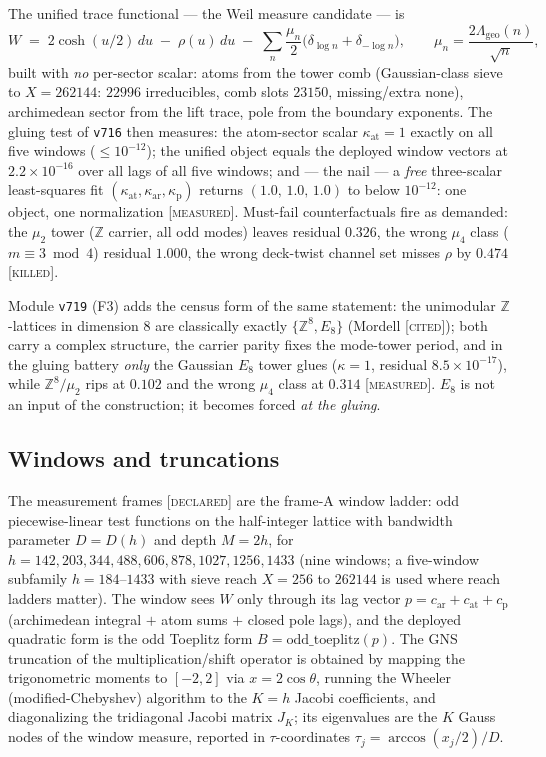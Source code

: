 \documentclass[11pt,a4paper]{article}
\theoremstyle{remark}
\newcommand{\Z}{\mathbb Z}
\newcommand{\MEASURED}{\textnormal{[\textsc{measured}]}}
\newcommand{\KILLED}{\textnormal{[\textsc{killed}]}}
\newcommand{\DECLARED}{\textnormal{[\textsc{declared}]}}
\newcommand{\CITED}{\textnormal{[\textsc{cited}]}}
\begin{document}
The unified trace functional --- the Weil measure candidate --- is
\begin{equation}\label{eq:weilmeasure}
W \;=\; 2\cosh(u/2)\,du\;-\;\rho(u)\,du\;-\;
\sum_{n}\frac{\mu_n}{2}\bigl(\delta_{\log n}+\delta_{-\log n}\bigr),
\qquad \mu_n=\frac{2\Lambda_{\mathrm{geo}}(n)}{\sqrt n},
\end{equation}
built with \emph{no} per-sector scalar: atoms from the tower comb
(Gaussian-class sieve to $X=262144$: $22996$ irreducibles, comb
slots $23150$, missing/extra none), archimedean sector from the lift
trace, pole from the boundary exponents.  The gluing test of
\texttt{v716} then measures: the atom-sector scalar
$\kappa_{\mathrm{at}}=1$ exactly on all five windows
($\le10^{-12}$); the unified object equals the deployed window
vectors at $2.2\times10^{-16}$ over all lags of all five windows; and
--- the nail --- a \emph{free} three-scalar least-squares fit
$(\kappa_{\mathrm{at}},\kappa_{\mathrm{ar}},\kappa_{\mathrm p})$
returns $(1.0,\,1.0,\,1.0)$ to below $10^{-12}$: one object, one
normalization \MEASURED.  Must-fail counterfactuals fire as demanded:
the $\mu_2$ tower ($\Z$ carrier, all odd modes) leaves residual
$0.326$, the wrong $\mu_4$ class ($m\equiv3\bmod4$) residual
$1.000$, the wrong deck-twist channel set misses $\rho$ by $0.474$
\KILLED.

Module \texttt{v719} (F3) adds the census form of the same
statement: the unimodular $\Z$-lattices in dimension $8$ are
classically exactly $\{\Z^8,E_8\}$ (Mordell \CITED); both carry a
complex structure, the carrier parity fixes the mode-tower period,
and in the gluing battery \emph{only} the Gaussian $E_8$ tower glues
($\kappa=1$, residual $8.5\times10^{-17}$), while $\Z^8/\mu_2$ rips
at $0.102$ and the wrong $\mu_4$ class at $0.314$ \MEASURED.  $E_8$
is not an input of the construction; it becomes forced \emph{at the
gluing}.

\subsection{Windows and truncations}\label{sec:windows}

The measurement frames \DECLARED{} are the frame-A window ladder:
odd piecewise-linear test functions on the half-integer lattice with
bandwidth parameter $D=D(h)$ and depth $M=2h$, for
$h=142,203,344,488,606,878,1027,1256,1433$ (nine windows; a
five-window subfamily $h=184$--$1433$ with sieve reach $X=256$ to
$262144$ is used where reach ladders matter).  The window sees $W$
only through its lag vector $p=c_{\mathrm{ar}}+c_{\mathrm{at}}
+c_{\mathrm p}$ (archimedean integral $+$ atom sums $+$ closed pole
lags), and the deployed quadratic form is the odd Toeplitz form
$B=\mathrm{odd\_toeplitz}(p)$.  The GNS truncation of the
multiplication/shift operator is obtained by mapping the trigonometric
moments to $[-2,2]$ via $x=2\cos\theta$, running the Wheeler
(modified-Chebyshev) algorithm to the $K=h$ Jacobi coefficients, and
diagonalizing the tridiagonal Jacobi matrix $J_K$; its eigenvalues
are the $K$ Gauss nodes of the window measure, reported in
$\tau$-coordinates $\tau_j=\arccos(x_j/2)/D$.
\end{document}
